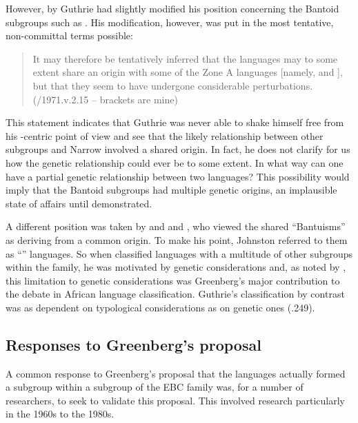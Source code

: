 \documentclass[output=paper]{langsci/langscibook}
\begin{document}
However, by \citeyear{Guthrie1971} Guthrie had slightly modified his position concerning the Bantoid subgroups such as . His modification, however, was put in the most tentative, non-committal terms possible:

\begin{quote}
It may therefore be tentatively inferred that the  languages may to some extent share an origin with some of the Zone A languages [namely,  and ], but that they seem to have undergone considerable perturbations. (\citealt{Guthrie1967}/1971.v.2.15 – brackets are mine)
\end{quote}

This statement indicates that Guthrie was never able to shake himself free from his -centric point of view and see that the likely relationship between other  subgroups and Narrow  involved a shared origin. In fact, he does not clarify for us how the genetic relationship could ever be {\textquotedbl}to some extent{\textquotedbl}.  In what way can one have a partial genetic relationship between two languages?  This possibility would imply that the Bantoid subgroups had multiple genetic origins, an implausible state of affairs until demonstrated. 

A different position was taken by \citet{Johnston191922} and \citet{Westermann1927} and   \citet{WestermannBryan1952}, who viewed the shared “Bantuisms” as deriving from a common origin. To make his point, Johnston referred to them as “” languages. So when \citet{Greenberg1963} classified  languages with a multitude of other subgroups within the  family, he was motivated by genetic considerations and, as noted by \citet{Winston1966}, this limitation to genetic considerations was Greenberg’s major contribution to the debate in African language classification.  Guthrie’s classification by contrast was as dependent on typological considerations as on genetic ones (\citealt{Williamson1971}.249). 

\subsection{Responses to Greenberg’s proposal}


A common response to Greenberg’s proposal that the  languages actually formed a subgroup within a subgroup of the EBC family was, for a number of researchers, to seek to validate this proposal. This involved research particularly in the 1960s to the 1980s. 
\end{document}
